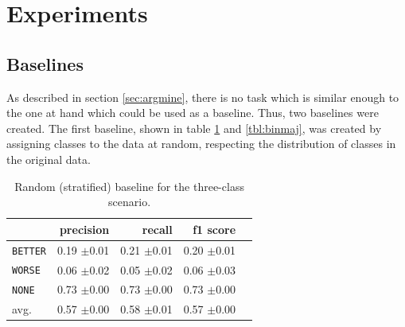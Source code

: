 \section{Experiments}
\subsection{Baselines}
\label{sec:3_baseline}
As described in section \ref{sec:argmine}, there is no task which is similar enough to the one at hand which could be used as a baseline. Thus, two baselines were created. 
The first baseline, shown in table \ref{tbl:3stratifiedbaseline} and \ref{tbl:binmaj}, was created by assigning classes to the data at random, respecting the distribution of classes in the original data.  
\begin{table}[!htb]
	\begin{minipage}{.5\linewidth}
		\caption{Random (stratified) baseline for the three-class scenario.}
		\label{tbl:3stratifiedbaseline}
		\centering
		      
		\begin{tabularx}{0.97\linewidth}{Xrrrr}
			\toprule
			                & precision                    & recall                       & f1 score                     \\ \midrule 
			\texttt{BETTER} & 0.19 \scriptsize{$\pm$0.01} & 0.21 \scriptsize{$\pm$0.01} & 0.20 \scriptsize{$\pm$0.01} \\ 
			\texttt{WORSE}  & 0.06 \scriptsize{$\pm$0.02} & 0.05 \scriptsize{$\pm$0.02} & 0.06 \scriptsize{$\pm$0.03} \\ 
			\texttt{NONE}   & 0.73 \scriptsize{$\pm$0.00}  & 0.73 \scriptsize{$\pm$0.00} & 0.73 \scriptsize{$\pm$0.00} \\ 
			avg.         & 0.57 \scriptsize{$\pm$0.00} & 0.58 \scriptsize{$\pm$0.01} & 0.57 \scriptsize{$\pm$0.00} \\ 
			\bottomrule
		\end{tabularx} 
		

\end{minipage}
\end{table}
